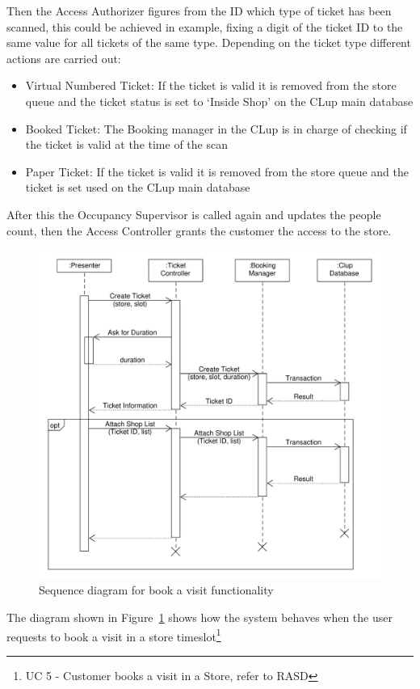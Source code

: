 Then the Access Authorizer figures from the ID which type of ticket has been scanned, this could be achieved in example, fixing a digit of the ticket ID to the same value for all tickets of the same type.
Depending on the ticket type different actions are carried out:
\begin{itemize}
    \item Virtual Numbered Ticket: If the ticket is valid it is removed from the store queue and the ticket status is set to `Inside Shop' on the CLup main database
    \item Booked Ticket: The Booking manager in the CLup is in charge of checking if the ticket is valid at the time of the scan
    \item Paper Ticket:  If the ticket is valid it is removed from the store queue and the ticket is set used on the CLup main database
\end{itemize}

After this the Occupancy Supervisor is called again and updates the people count, then the Access Controller grants the customer the access to the store.
\begin{figure}[H]
    \includegraphics[width=\textwidth]{Images/UML_user_book_visit.pdf}
    \caption{\label{fig:UML_user_book_visit}Sequence diagram for book a visit functionality}
\end{figure}
The diagram shown in Figure~\ref{fig:UML_user_book_visit} shows how the system behaves when the user requests to book a visit in a store timeslot\footnote{UC 5 - Customer books a visit in a Store, refer to RASD}

